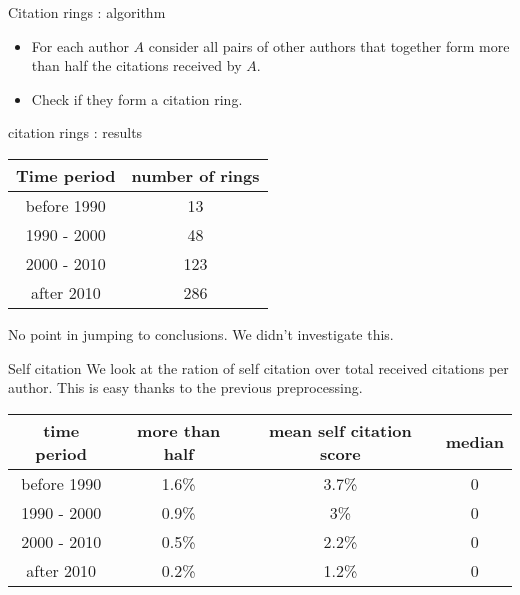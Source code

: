 \documentclass[10pt]{beamer}
\begin{document}
\begin{frame}{Citation rings : algorithm}
  \begin{itemize}
      \item For each author $A$ consider all pairs of other authors that together form more than half the citations received by $A$.
      \item Check if they form a citation ring.
    \end{itemize}
  \end{frame}

\begin{frame}{citation rings : results}

     \begin{center}
     \begin{tabular}{||c c||} 
      \hline
      Time period & number of rings \\
      \hline\hline
      before 1990 & 13 \\ 
      \hline
      1990 - 2000 & 48 \\
      \hline
      2000 - 2010 & 123 \\
      \hline
      after 2010 & 286 \\
      \hline
     \end{tabular}
     \end{center}

     No point in jumping to conclusions. We didn't investigate this.

  \end{frame}

\begin{frame}{Self citation}
  We look at the ration of self citation over total received citations per author. This is easy thanks to the previous preprocessing. 

    \vspace{0.5cm}

     \begin{center}
     \begin{tabular}{||c c c c||} 
      \hline
      time period & more than half & mean self citation score & median\\
      \hline\hline
      before 1990 & 1.6\% & 3.7\% & 0 \\ 
      \hline
      1990 - 2000 & 0.9\% & 3\% & 0 \\
      \hline
      2000 - 2010 & 0.5\% & 2.2\% & 0 \\
      \hline
      after 2010 & 0.2\% & 1.2\% & 0 \\
      \hline
     \end{tabular}
     \end{center}
  \end{frame}
\end{document}
